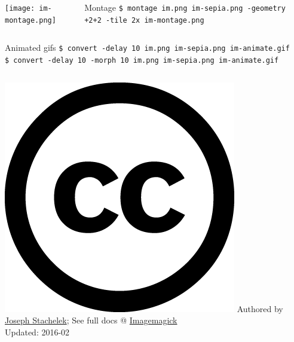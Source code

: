 \documentclass[hyperref={colorlinks,citecolor=pink,linkcolor=red,urlcolor=blue}]{beamer}
\begin{document}
\begin{frame}
\begin{minipage}[0.2\textheight]{\textwidth}
\begin{columns}[T]
			\texttt{[image: im-montage.png]}\\
			\begin{exampleblock}{Montage}
				\texttt{\$ montage im.png im-sepia.png -geometry +2+2 -tile 2x im-montage.png}\\
			\end{exampleblock}	
	\end{columns}
\end{minipage}


\begin{minipage}[0.2\textheight]{\textwidth}
	\begin{columns}[T]
			\begin{exampleblock}{Animated gifs}
				\texttt{\$ convert -delay 10 im.png im-sepia.png im-animate.gif}\\
				\texttt{\$ convert -delay 10 -morph 10 im.png im-sepia.png im-animate.gif}
			\end{exampleblock}	
	\end{columns}
\end{minipage}


\href{https://creativecommons.org/licenses/by/4.0/}{\includegraphics[height=.15in]{cc.large.png}} Authored by \href{http://jsta.github.io}{Joseph Stachelek}; See full docs @
\href{http://www.imagemagick.org}{Imagemagick}\\
Updated: 2016-02 
\end{frame}
\end{document}
